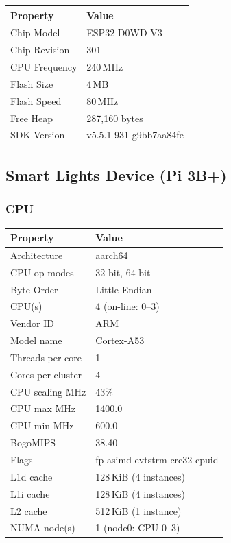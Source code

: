\documentclass[11pt,letterpaper]{article}
\begin{document}
\begin{tabular}{@{}L{5cm}L{9cm}@{}}
\toprule
\textbf{Property} & \textbf{Value} \\
\midrule
Chip Model    & ESP32-D0WD-V3 \\
Chip Revision & 301 \\
CPU Frequency & 240\,MHz \\
Flash Size    & 4\,MB \\
Flash Speed   & 80\,MHz \\
Free Heap     & 287,160 bytes \\
SDK Version   & v5.5.1-931-g9bb7aa84fe \\
\bottomrule
\end{tabular}

\subsection{Smart Lights Device (Pi 3B+)}

\subsubsection{CPU}

\begin{tabular}{@{}L{5cm}L{9cm}@{}}
\toprule
\textbf{Property} & \textbf{Value} \\
\midrule
Architecture    & aarch64 \\
CPU op-modes    & 32-bit, 64-bit \\
Byte Order      & Little Endian \\
CPU(s)          & 4 (on-line: 0--3) \\
Vendor ID       & ARM \\
Model name      & Cortex-A53 \\
Threads per core & 1 \\
Cores per cluster & 4 \\
CPU scaling MHz & 43\% \\
CPU max MHz     & 1400.0 \\
CPU min MHz     & 600.0 \\
BogoMIPS        & 38.40 \\
Flags           & fp asimd evtstrm crc32 cpuid \\
L1d cache       & 128\,KiB (4 instances) \\
L1i cache       & 128\,KiB (4 instances) \\
L2 cache        & 512\,KiB (1 instance) \\
NUMA node(s)    & 1 (node0: CPU 0--3) \\
\bottomrule
\end{tabular}
\end{document}
